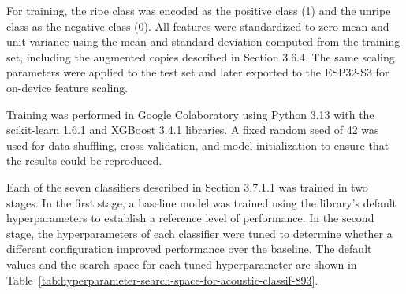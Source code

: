 \begin{thesisprose}
For training, the ripe class was encoded as the positive class (1) and the unripe class as the negative class (0). All features were standardized to zero mean and unit variance using the mean and standard deviation computed from the training set, including the augmented copies described in Section 3.6.4. The same scaling parameters were applied to the test set and later exported to the ESP32-S3 for on-device feature scaling.

Training was performed in Google Colaboratory using Python 3.13 with the scikit-learn 1.6.1 and XGBoost 3.4.1 libraries. A fixed random seed of 42 was used for data shuffling, cross-validation, and model initialization to ensure that the results could be reproduced.

Each of the seven classifiers described in Section 3.7.1.1 was trained in two stages. In the first stage, a baseline model was trained using the library’s default hyperparameters to establish a reference level of performance. In the second stage, the hyperparameters of each classifier were tuned to determine whether a different configuration improved performance over the baseline. The default values and the search space for each tuned hyperparameter are shown in Table~\ref{tab:hyperparameter-search-space-for-acoustic-classif-893}.


\end{thesisprose}
